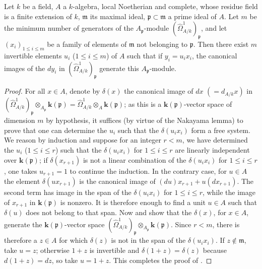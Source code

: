 \begin{lemma}[18.11.5.2]
\label{IV.18.11.5.2}
Let $k$ be a field, $A$ a $k$-algebra, local Noetherian and complete, whose residue field is a finite extension of $k$, $\mathfrak{m}$ its maximal ideal, $\mathfrak{p}\subset\mathfrak{m}$ a prime ideal of $A$.
Let $m$ be the minimum number of generators of the $A_\mathfrak{p}$-module $(\hat{\Omega}^1_{A/k})_\mathfrak{p}$, and let $(x_i)_{1\leq i\leq m}$ be a family of elements of $\mathfrak{m}$ not belonging to $\mathfrak{p}$.
Then there exist $m$ invertible elements $u_i$ \textup{(}$1\leq i\leq m$\textup{)} of $A$ such that if $y_i=u_ix_i$, the canonical images of the $dy_i$ in $(\hat{\Omega}^1_{A/k})_\mathfrak{p}$ generate this $A_\mathfrak{p}$-module.
\end{lemma}

\begin{proof}
For all $x\in A$, denote by $\delta(x)$ the canonical image of $dx$ $(=d_{A/k}x)$ in $(\hat{\Omega}^1_{A/k})_\mathfrak{p}\otimes_{A_\mathfrak{p}}\boldsymbol{k}(\mathfrak{p})=\hat{\Omega}^1_{A/k}\otimes_{A}\boldsymbol{k}(\mathfrak{p})$; as this is a $\boldsymbol{k}(\mathfrak{p})$-vector space of dimension $m$ by hypothesis, it suffices (by virtue of the Nakayama lemma) to prove that one can determine the $u_i$ such that the $\delta(u_ix_i)$ form a free system.
We reason by induction and suppose for an integer $r<m$, we have determined the $u_i$ ($1\leq i\leq r$) such that the $\delta(u_ix_i)$ for $1\leq i\leq r$ are linearly independent over $\boldsymbol{k}(\mathfrak{p})$; if $\delta(x_{r+1})$ is not a linear combination of the $\delta(u_ix_i)$ for $1\leq i\leq r$, one takes $u_{r+1}=1$ to continue the induction.
In the contrary case, for $u\in A$ the element $\delta(ux_{r+1})$ is the canonical image of $(du)x_{r+1}+u(dx_{r+1})$. The second term has image in the span of the $\delta(u_ix_i)$ for $1\leq i\leq r$, while the image of $x_{r+1}$ in $\boldsymbol{k}(\mathfrak p)$ is nonzero. It is therefore enough to find a unit $u\in A$ such that $\delta(u)$ does not belong to that span.
Now  and  show that the $\delta(x)$, for $x\in A$, generate the $\boldsymbol{k}(\mathfrak p)$-vector space $(\hat{\Omega}^1_{A/k})_{\mathfrak p}\otimes_{A_{\mathfrak p}}\boldsymbol{k}(\mathfrak p)$. Since $r<m$, there is therefore a $z\in A$ for which $\delta(z)$ is not in the span of the $\delta(u_ix_i)$. If $z\notin\mathfrak m$, take $u=z$; otherwise $1+z$ is invertible and $\delta(1+z)=\delta(z)$ because $d(1+z)=dz$, so take $u=1+z$. This completes the proof of .
\end{proof}

